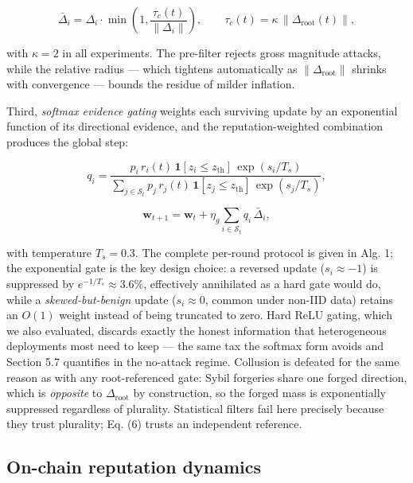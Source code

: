 \documentclass[cmc,article,submit,moreauthors,pdftex]{Definitions/tsp}
\begin{document}
\begin{equation}
\bar{\Delta}_i = \Delta_i \cdot \min\!\left(1, \frac{\tau_c(t)}{\|\Delta_i\|}\right), \qquad \tau_c(t) = \kappa \, \|\Delta_{\mathrm{root}}(t)\|,
\tag{5}
\end{equation}

with $\kappa = 2$ in all experiments. The pre-filter rejects gross magnitude attacks, while the relative radius --- which tightens automatically as $\|\Delta_{\mathrm{root}}\|$ shrinks with convergence --- bounds the residue of milder inflation.

Third, \emph{softmax evidence gating} weights each surviving update by an exponential function of its directional evidence, and the reputation-weighted combination produces the global step:

\begin{equation}
q_i = \frac{p_i \, r_i(t)\,\mathbf{1}[z_i \le z_{\mathrm{th}}]\,\exp(s_i/T_s)}{\sum_{j \in \mathcal{S}_t} p_j \, r_j(t)\,\mathbf{1}[z_j \le z_{\mathrm{th}}]\,\exp(s_j/T_s)},
\tag{6}
\end{equation}

\begin{equation}
\mathbf{w}_{t+1} = \mathbf{w}_t + \eta_g \sum_{i \in \mathcal{S}_t} q_i \, \bar{\Delta}_i,
\tag{7}
\end{equation}

with temperature $T_s = 0.3$. The complete per-round protocol is given in Alg. 1; the exponential gate is the key design choice: a reversed update ($s_i \approx -1$) is suppressed by $e^{-1/T_s} \approx 3.6\%$, effectively annihilated as a hard gate would do, while a \emph{skewed-but-benign} update ($s_i \approx 0$, common under non-IID data) retains an $O(1)$ weight instead of being truncated to zero. Hard ReLU gating, which we also evaluated, discards exactly the honest information that heterogeneous deployments most need to keep --- the same tax the softmax form avoids and Section 5.7 quantifies in the no-attack regime. Collusion is defeated for the same reason as with any root-referenced gate: Sybil forgeries share one forged direction, which is \emph{opposite} to $\Delta_{\mathrm{root}}$ by construction, so the forged mass is exponentially suppressed regardless of plurality. Statistical filters fail here precisely because they trust plurality; Eq. (6) trusts an independent reference.

\subsection{On-chain reputation dynamics}\label{sec:on-chain-reputation-dynamics}
\end{document}
